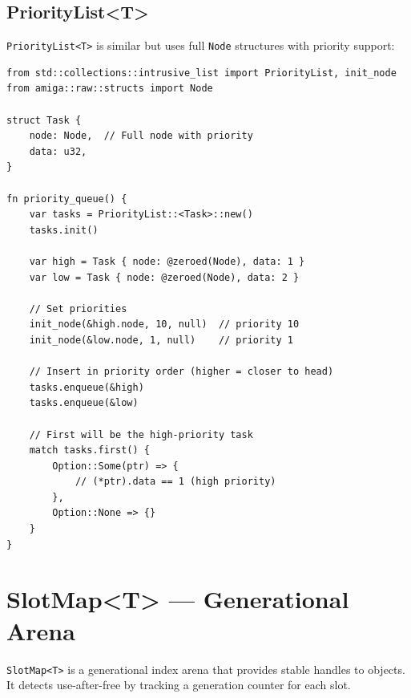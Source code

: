 \subsection{PriorityList<T>}

\texttt{PriorityList<T>} is similar but uses full \texttt{Node} structures with priority support:

\begin{lstlisting}
from std::collections::intrusive_list import PriorityList, init_node
from amiga::raw::structs import Node

struct Task {
    node: Node,  // Full node with priority
    data: u32,
}

fn priority_queue() {
    var tasks = PriorityList::<Task>::new()
    tasks.init()

    var high = Task { node: @zeroed(Node), data: 1 }
    var low = Task { node: @zeroed(Node), data: 2 }

    // Set priorities
    init_node(&high.node, 10, null)  // priority 10
    init_node(&low.node, 1, null)    // priority 1

    // Insert in priority order (higher = closer to head)
    tasks.enqueue(&high)
    tasks.enqueue(&low)

    // First will be the high-priority task
    match tasks.first() {
        Option::Some(ptr) => {
            // (*ptr).data == 1 (high priority)
        },
        Option::None => {}
    }
}
\end{lstlisting}

\section{SlotMap<T> --- Generational Arena}
\label{sec:slotmap}

\texttt{SlotMap<T>} is a generational index arena that provides stable handles to objects. It detects use-after-free by tracking a generation counter for each slot.

